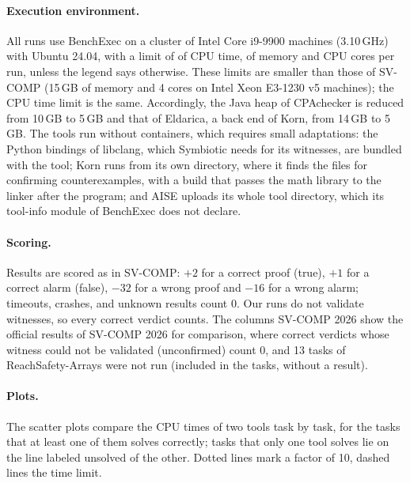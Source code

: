\paragraph{Execution environment.}
All runs use BenchExec on a cluster of Intel Core i9-9900 machines (3.10\,GHz) with Ubuntu 24.04,
with a limit of \TimeLimit{} of CPU time, \MemoryLimit{} of memory and \Cores{} CPU cores per run,
unless the legend says otherwise. These limits are smaller than those of SV-COMP (15\,GB of memory and
4 cores on Intel Xeon E3-1230 v5 machines); the CPU time limit is the same. Accordingly, the Java heap
of CPAchecker is reduced from 10\,GB to 5\,GB and that of Eldarica, a back end of Korn, from 14\,GB
to 5\,GB. The tools run without containers, which requires small adaptations: the Python bindings
of libclang, which Symbiotic needs for its witnesses, are bundled with the tool; Korn runs from its
own directory, where it finds the files for confirming counterexamples, with a build that passes the
math library to the linker after the program; and AISE uploads its whole tool directory, which its
tool-info module of BenchExec does not declare.

\paragraph{Scoring.}
Results are scored as in SV-COMP: $+2$ for a correct proof (true), $+1$ for a correct alarm
(false), $-32$ for a wrong proof and $-16$ for a wrong alarm; timeouts, crashes, and unknown results
count $0$. Our runs do not validate witnesses, so every correct verdict counts. The columns SV-COMP 2026 show
the official results of SV-COMP 2026 for comparison, where correct verdicts whose witness could not be
validated (unconfirmed) count $0$, and 13 tasks of ReachSafety-Arrays were not run (included in the
tasks, without a result).

\paragraph{Plots.}
The scatter plots compare the CPU times of two tools task by task, for the tasks that at least one of
them solves correctly; tasks that only one tool solves lie on the line labeled unsolved of the other.
Dotted lines mark a factor of 10, dashed lines the time limit.
